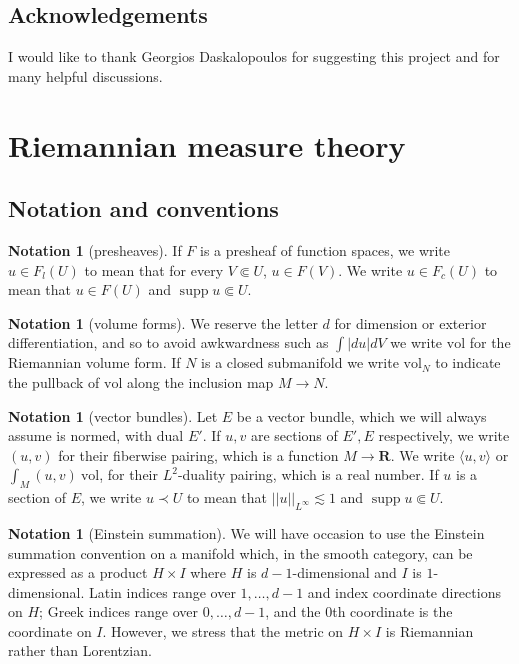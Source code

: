 \documentclass[reqno,12pt,letterpaper]{amsart}
\newcommand{\RR}{\mathbf{R}}
\DeclareMathOperator{\supp}{supp}
\newcommand{\vol}{\mathrm{vol}}
\theoremstyle{definition}
\newtheorem{notation}[theorem]{Notation}
\numberwithin{equation}{section}
\begin{document}

\subsection{Acknowledgements}
I would like to thank Georgios Daskalopoulos for suggesting this project and for many helpful discussions.


\section{Riemannian measure theory}\label{RiemMeasureThy}
\subsection{Notation and conventions}
\begin{notation}[presheaves]
If $F$ is a presheaf of function spaces, we write $u \in F_l(U)$ to mean that for every $V \Subset U$, $u \in F(V)$.
We write $u \in F_c(U)$ to mean that $u \in F(U)$ and $\supp u \Subset U$.
\end{notation}

\begin{notation}[volume forms]
We reserve the letter $d$ for dimension or exterior differentiation, and so to avoid awkwardness such as $\int |du| dV$ we write $\vol$ for the Riemannian volume form.
If $N$ is a closed submanifold we write $\vol_N$ to indicate the pullback of $\vol$ along the inclusion map $M \to N$.
\end{notation}

\begin{notation}[vector bundles]
Let $E$ be a vector bundle, which we will always assume is normed, with dual $E'$.
If $u,v$ are sections of $E',E$ respectively, we write $(u, v)$ for their fiberwise pairing, which is a function $M \to \RR$.
We write $\langle u, v\rangle$ or $\int_M (u, v) ~\vol$, for their $L^2$-duality pairing, which is a real number.
If $u$ is a section of $E$, we write $u \prec U$ to mean that $||u||_{L^\infty} \lesssim 1$ and $\supp u \Subset U$.
\end{notation}

\begin{notation}[Einstein summation]\label{EinsteinNotation}
We will have occasion to use the Einstein summation convention on a manifold which, in the smooth category, can be expressed as a product $H \times I$ where $H$ is $d-1$-dimensional and $I$ is $1$-dimensional.
Latin indices range over $1, \dots, d - 1$ and index coordinate directions on $H$; Greek indices range over $0, \dots, d - 1$, and the $0$th coordinate is the coordinate on $I$.
However, we stress that the metric on $H \times I$ is Riemannian rather than Lorentzian.
\end{notation}
\end{document}
